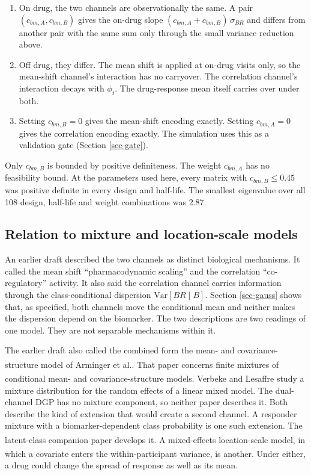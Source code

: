 \documentclass[
  11pt,
]{article}
\providecommand{\tightlist}{%
  \setlength{\itemsep}{0pt}\setlength{\parskip}{0pt}}
\begin{document}
\begin{enumerate}
\def\labelenumi{\arabic{enumi}.}
\tightlist
\item
  On drug, the two channels are observationally the same. A pair
  \((c_{bm,A}, c_{bm,B})\) gives the on-drug slope
  \((c_{bm,A} + c_{bm,B})\,\sigma_{BR}\) and differs from another
  pair with the same sum only through the small variance reduction
  above.
\item
  Off drug, they differ. The mean shift is applied at on-drug
  visits only, so the mean-shift channel's interaction has no
  carryover. The correlation channel's interaction decays with
  \(\phi_t\). The drug-response mean itself carries over under both.
\item
  Setting \(c_{bm,B} = 0\) gives the mean-shift encoding exactly.
  Setting \(c_{bm,A} = 0\) gives the correlation encoding exactly. The
  simulation uses this as a validation gate (Section
  \ref{sec-gate}).
\end{enumerate}

Only \(c_{bm,B}\) is bounded by positive definiteness. The weight
\(c_{bm,A}\) has no feasibility bound. At the parameters used here,
every matrix with \(c_{bm,B} \le 0.45\) was positive definite in every
design and half-life. The smallest eigenvalue over all
108 design, half-life and weight combinations
was 2.87.

\subsection{Relation to mixture and location-scale models}\label{relation-to-mixture-and-location-scale-models}

An earlier draft described the two channels as distinct biological
mechanisms. It called the mean shift ``pharmacodynamic scaling'' and the
correlation ``co-regulatory'' activity. It also said the correlation
channel carries information through the class-conditional dispersion
\(\mathrm{Var}[BR \mid B]\). Section \ref{sec-gauss} shows that, as
specified, both channels move the conditional mean and neither makes
the dispersion depend on the biomarker. The two descriptions are two
readings of one model. They are not separable mechanisms within it.

The earlier draft also called the combined form the mean- and
covariance-structure model of Arminger et al.\textsuperscript{}. That
paper concerns finite mixtures of conditional mean- and
covariance-structure models. Verbeke and Lesaffre\textsuperscript{} study a mixture distribution for the random
effects of a linear mixed model. The dual-channel DGP has no mixture
component, so neither paper describes it. Both describe the kind of
extension that would create a second channel. A responder mixture
with a biomarker-dependent class probability is one such extension.
The latent-class companion paper develops it\textsuperscript{}.
A mixed-effects location-scale model, in which a covariate enters the
within-participant variance, is another\textsuperscript{}. Under either,
a drug could change the spread of response as well as its mean.
\end{document}
